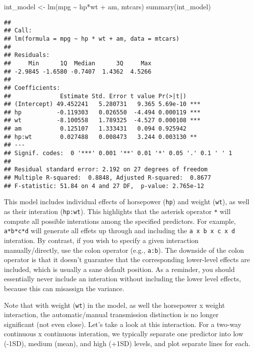 \documentclass[
]{book}
\newenvironment{Shaded}{\begin{snugshade}}{\end{snugshade}}
\newcommand{\FunctionTok}[1]{\textcolor[rgb]{0.00,0.00,0.00}{#1}}
\newcommand{\NormalTok}[1]{#1}
\newcommand{\OtherTok}[1]{\textcolor[rgb]{0.56,0.35,0.01}{#1}}
\newcommand{\SpecialCharTok}[1]{\textcolor[rgb]{0.00,0.00,0.00}{#1}}
\begin{document}
\begin{Shaded}
\begin{Highlighting}[]
\NormalTok{int\_model }\OtherTok{\textless{}{-}} \FunctionTok{lm}\NormalTok{(mpg }\SpecialCharTok{\textasciitilde{}}\NormalTok{ hp}\SpecialCharTok{*}\NormalTok{wt }\SpecialCharTok{+}\NormalTok{ am, mtcars)}
\FunctionTok{summary}\NormalTok{(int\_model)}
\end{Highlighting}
\end{Shaded}

\begin{verbatim}
## 
## Call:
## lm(formula = mpg ~ hp * wt + am, data = mtcars)
## 
## Residuals:
##     Min      1Q  Median      3Q     Max 
## -2.9845 -1.6580 -0.7407  1.4362  4.5266 
## 
## Coefficients:
##              Estimate Std. Error t value Pr(>|t|)    
## (Intercept) 49.452241   5.280731   9.365 5.69e-10 ***
## hp          -0.119303   0.026550  -4.494 0.000119 ***
## wt          -8.100558   1.789325  -4.527 0.000108 ***
## am           0.125107   1.333431   0.094 0.925942    
## hp:wt        0.027488   0.008473   3.244 0.003130 ** 
## ---
## Signif. codes:  0 '***' 0.001 '**' 0.01 '*' 0.05 '.' 0.1 ' ' 1
## 
## Residual standard error: 2.192 on 27 degrees of freedom
## Multiple R-squared:  0.8848, Adjusted R-squared:  0.8677 
## F-statistic: 51.84 on 4 and 27 DF,  p-value: 2.765e-12
\end{verbatim}

This model includes individual effects of horsepower (\texttt{hp}) and weight (\texttt{wt}), as well as their interation (\texttt{hp:wt}). This highlights that the asterisk operator \texttt{*} will compute all possible interations among the specified predictors. For example, \texttt{a*b*c*d} will generate all effets up through and including the \texttt{a\ x\ b\ x\ c\ x\ d} interation. By contrast, if you wish to specify a given interaction manually/directly, use the colon operator (e.g., \texttt{a:b}). The downside of the colon operator is that it doesn't guarantee that the corresponding lower-level effects are included, which is usually a sane default position. As a reminder, you should essentially never include an interation without including the lower level effects, because this can misassign the variance.

Note that with weight (\texttt{wt}) in the model, as well the horsepower x weight interaction, the automatic/manual transmission distinction is no longer significant (not even close). Let's take a look at this interaction. For a two-way continuous x continuous interation, we typically separate one predictor into low (-1SD), medium (mean), and high (+1SD) levels, and plot separate lines for each.
\end{document}
